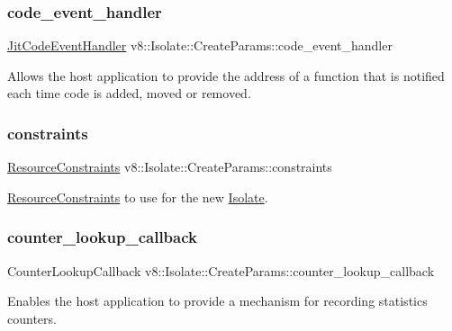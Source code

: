 \subsubsection{\texorpdfstring{code\+\_\+event\+\_\+handler}{code\_event\_handler}}
{\footnotesize\ttfamily \mbox{\hyperlink{namespacev8_a39243bc91e63d64d111452fdb98c4733}{Jit\+Code\+Event\+Handler}} v8\+::\+Isolate\+::\+Create\+Params\+::code\+\_\+event\+\_\+handler}

Allows the host application to provide the address of a function that is notified each time code is added, moved or removed. \mbox{\label{structv8_1_1Isolate_1_1CreateParams_a2c570b306aa8c1c24cfe70e8eee50fa1}} 
\subsubsection{\texorpdfstring{constraints}{constraints}}
{\footnotesize\ttfamily \mbox{\hyperlink{classv8_1_1ResourceConstraints}{Resource\+Constraints}} v8\+::\+Isolate\+::\+Create\+Params\+::constraints}

\mbox{\hyperlink{classv8_1_1ResourceConstraints}{Resource\+Constraints}} to use for the new \mbox{\hyperlink{classv8_1_1Isolate}{Isolate}}. \mbox{\label{structv8_1_1Isolate_1_1CreateParams_a10441abadd0b83a938303c92e7444fb6}} 
\subsubsection{\texorpdfstring{counter\+\_\+lookup\+\_\+callback}{counter\_lookup\_callback}}
{\footnotesize\ttfamily Counter\+Lookup\+Callback v8\+::\+Isolate\+::\+Create\+Params\+::counter\+\_\+lookup\+\_\+callback}

Enables the host application to provide a mechanism for recording statistics counters. \mbox{\label{structv8_1_1Isolate_1_1CreateParams_a11acf5fb9cdbc4c8bf15baf542507b49}} 
